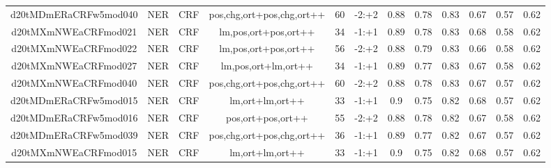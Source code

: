 \documentclass[a4paper]{article}
\begin{document}
\begin{landscape}
\begin{center}
\begin{tabular}{ |c|c|c|c|c|c|c|c|c|c|c|c|}
 	
 
 	
 		
 		\small{ d20tMDmERaCRFw5mod040 } & NER & CRF & pos,chg,ort+pos,chg,ort++  &  60 &  -2:+2  &  0.88 & 0.78 & 0.83  &  0.67 & 0.57 & 0.62 \\
 		

 	
 
 	
 		
 		\small{ d20tMXmNWEaCRFmod021 } & NER & CRF & lm,pos,ort+pos,ort++  &  34 &  -1:+1  &  0.89 & 0.78 & 0.83  &  0.68 & 0.58 & 0.62 \\
 		

 	
 
 	
 		
 		\small{ d20tMXmNWEaCRFmod022 } & NER & CRF & lm,pos,ort+pos,ort++  &  56 &  -2:+2  &  0.88 & 0.79 & 0.83  &  0.66 & 0.58 & 0.62 \\
 		

 	
 
 	
 		
 		\small{ d20tMXmNWEaCRFmod027 } & NER & CRF & lm,pos,ort+lm,ort++  &  34 &  -1:+1  &  0.89 & 0.77 & 0.83  &  0.67 & 0.58 & 0.62 \\
 		

 	
 
 	
 		
 		\small{ d20tMXmNWEaCRFmod040 } & NER & CRF & pos,chg,ort+pos,chg,ort++  &  60 &  -2:+2  &  0.88 & 0.78 & 0.83  &  0.67 & 0.57 & 0.62 \\
 		

 	
 
 	
 		
 		\small{ d20tMDmERaCRFw5mod015 } & NER & CRF & lm,ort+lm,ort++  &  33 &  -1:+1  &  0.9 & 0.75 & 0.82  &  0.68 & 0.57 & 0.62 \\
 		

 	
 
 	
 		
 		\small{ d20tMDmERaCRFw5mod016 } & NER & CRF & pos,ort+pos,ort++  &  55 &  -2:+2  &  0.88 & 0.78 & 0.82  &  0.67 & 0.58 & 0.62 \\
 		

 	
 
 	
 		
 		\small{ d20tMDmERaCRFw5mod039 } & NER & CRF & pos,chg,ort+pos,chg,ort++  &  36 &  -1:+1  &  0.89 & 0.77 & 0.82  &  0.67 & 0.57 & 0.62 \\
 		

 	
 
 	
 		
 		\small{ d20tMXmNWEaCRFmod015 } & NER & CRF & lm,ort+lm,ort++  &  33 &  -1:+1  &  0.9 & 0.75 & 0.82  &  0.68 & 0.57 & 0.62 \\
 		


\end{tabular}
\end{center}
\end{landscape}
\end{document}

